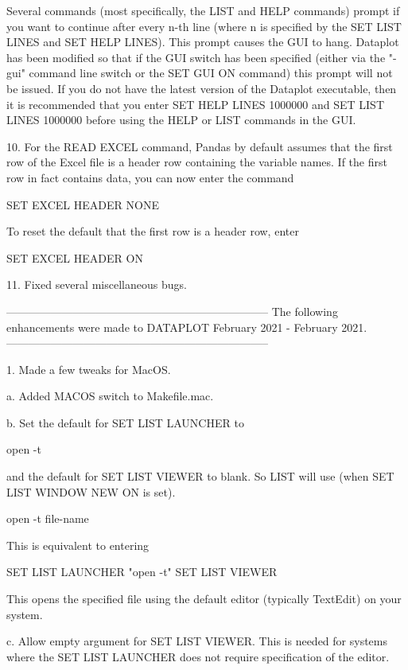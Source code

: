     Several commands (most specifically, the LIST and HELP commands)
    prompt if you want to continue after every n-th line (where n
    is specified by the SET LIST LINES and SET HELP LINES).  This
    prompt causes the GUI to hang.  Dataplot has been modified so
    that if the GUI switch has been specified (either via the
    "-gui" command line switch or the SET GUI ON command) this
    prompt will not be issued.  If you do not have the latest
    version of the Dataplot executable, then it is recommended
    that you enter SET HELP LINES 1000000 and SET LIST LINES 1000000
    before using the HELP or LIST commands in the GUI.

10. For the READ EXCEL command, Pandas by default assumes that the
    first row of the Excel file is a header row containing the variable
    names.  If the first row in fact contains data, you can now enter
    the command

        SET EXCEL HEADER NONE

    To reset the default that the first row is a header row, enter

        SET EXCEL HEADER ON

11. Fixed several miscellaneous bugs.

-----------------------------------------------------------------------
The following enhancements were made to DATAPLOT
February 2021 - February 2021.
-----------------------------------------------------------------------

 1. Made a few tweaks for MacOS.

    a. Added MACOS switch to Makefile.mac.

    b. Set the default for SET LIST LAUNCHER to

           open -t

       and the default for SET LIST VIEWER to blank.  So LIST
       will use (when SET LIST WINDOW NEW ON is set).

           open -t file-name

       This is equivalent to entering

           SET LIST LAUNCHER "open -t"
           SET LIST VIEWER

       This opens the specified file using the default editor
       (typically TextEdit) on your system.

    c. Allow empty argument for SET LIST VIEWER.  This is needed
       for systems where the SET LIST LAUNCHER does not require
       specification of the editor.

